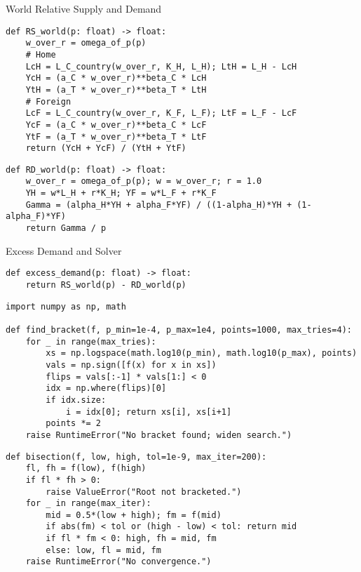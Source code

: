 \documentclass[notes,11pt,aspectratio=169,xcolor=table]{beamer}
\begin{document}
\begin{frame}[fragile=singleslide]{World Relative Supply and Demand}
\begin{verbatim}
def RS_world(p: float) -> float:
    w_over_r = omega_of_p(p)
    # Home
    LcH = L_C_country(w_over_r, K_H, L_H); LtH = L_H - LcH
    YcH = (a_C * w_over_r)**beta_C * LcH
    YtH = (a_T * w_over_r)**beta_T * LtH
    # Foreign
    LcF = L_C_country(w_over_r, K_F, L_F); LtF = L_F - LcF
    YcF = (a_C * w_over_r)**beta_C * LcF
    YtF = (a_T * w_over_r)**beta_T * LtF
    return (YcH + YcF) / (YtH + YtF)
\end{verbatim}

\begin{verbatim}
def RD_world(p: float) -> float:
    w_over_r = omega_of_p(p); w = w_over_r; r = 1.0
    YH = w*L_H + r*K_H; YF = w*L_F + r*K_F
    Gamma = (alpha_H*YH + alpha_F*YF) / ((1-alpha_H)*YH + (1-alpha_F)*YF)
    return Gamma / p
\end{verbatim}
\end{frame}

\begin{frame}[fragile=singleslide]{Excess Demand and Solver}
\begin{verbatim}
def excess_demand(p: float) -> float:
    return RS_world(p) - RD_world(p)
\end{verbatim}

\begin{verbatim}
import numpy as np, math

def find_bracket(f, p_min=1e-4, p_max=1e4, points=1000, max_tries=4):
    for _ in range(max_tries):
        xs = np.logspace(math.log10(p_min), math.log10(p_max), points)
        vals = np.sign([f(x) for x in xs])
        flips = vals[:-1] * vals[1:] < 0
        idx = np.where(flips)[0]
        if idx.size:
            i = idx[0]; return xs[i], xs[i+1]
        points *= 2
    raise RuntimeError("No bracket found; widen search.")
\end{verbatim}

\begin{verbatim}
def bisection(f, low, high, tol=1e-9, max_iter=200):
    fl, fh = f(low), f(high)
    if fl * fh > 0:
        raise ValueError("Root not bracketed.")
    for _ in range(max_iter):
        mid = 0.5*(low + high); fm = f(mid)
        if abs(fm) < tol or (high - low) < tol: return mid
        if fl * fm < 0: high, fh = mid, fm
        else: low, fl = mid, fm
    raise RuntimeError("No convergence.")
\end{verbatim}
\end{frame}
\end{document}
